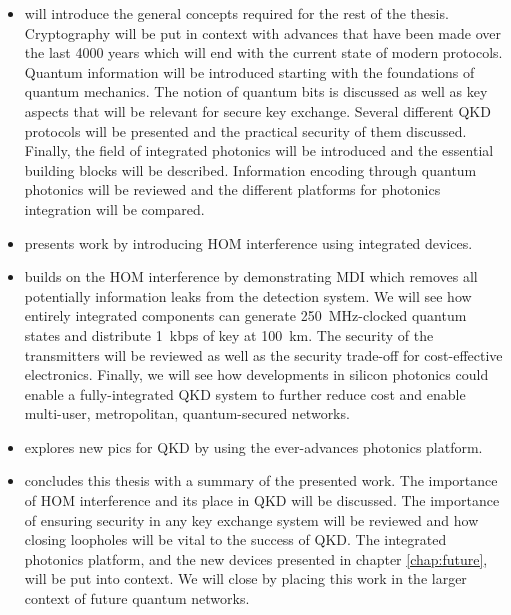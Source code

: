 \begin{itemize}
	\item {} will introduce the general concepts required for the rest of the thesis. Cryptography will be put in context with advances that have been made over the last 4000 years which will end with the current state of modern protocols. Quantum information will be introduced starting with the foundations of quantum mechanics. The notion of quantum bits is discussed as well as key aspects that will be relevant for secure key exchange. Several different \acl{QKD} protocols will be presented and the practical security of them discussed. Finally, the field of integrated photonics will be introduced and the essential building blocks will be described. Information encoding through quantum photonics will be reviewed and the different platforms for photonics integration will be compared.
	\item {} presents work by introducing \ac{HOM} interference using integrated devices. 
	\item {} builds on the \ac{HOM} interference by demonstrating \ac{MDI} which removes all potentially information leaks from the detection system. We will see how entirely integrated components can generate \SI{250}{MHz}-clocked quantum states and distribute \SI{1}{kbps} of key at \SI{100}{km}. The security of the transmitters will be reviewed as well as the security trade-off for cost-effective electronics. Finally, we will see how developments in silicon photonics could enable a fully-integrated \ac{QKD} system to further reduce cost and enable multi-user, metropolitan, quantum-secured networks.
	\item {} explores new \acp{pic} for \ac{QKD} by using the ever-advances photonics platform.
	\item {} concludes this thesis with a summary of the presented work. The importance of \ac{HOM} interference and its place in \ac{QKD} will be discussed. The importance of ensuring security in any key exchange system will be reviewed and how closing loopholes will be vital to the success of \ac{QKD}. The integrated photonics platform, and the new devices presented in chapter \ref{chap:future}, will be put into context. We will close by placing this work in the larger context of future quantum networks.
\end{itemize}

